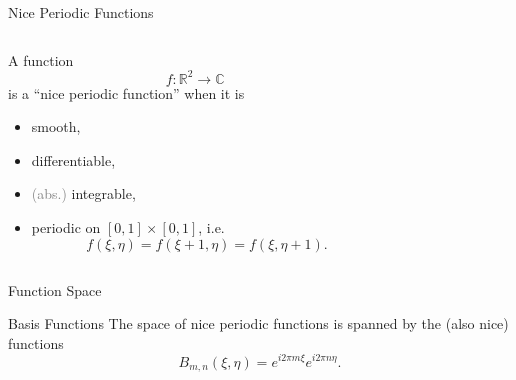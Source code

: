 \documentclass[xetex, onlymath, aspectratio=169]{beamer}
\begin{document}
\begin{frame}{Nice Periodic Functions}
	\begin{columns}
		\begin{column}{.7\linewidth}
    	\begin{definition}
    		A function
    		\[
    			f : \mathbb{R}^2 \to \mathbb{C}
    		\]
    		is a ``nice periodic function'' when it is
    		\begin{itemize}
    			\item smooth,
    			\item differentiable,
    			\item \textcolor{gray}{(abs.)} integrable,
    			\item periodic on \([0, 1] \times [0, 1]\), i.e.
    				\[
    					f(\xi, \eta) = f(\xi + 1, \eta) = f(\xi, \eta + 1).
    				\]
    		\end{itemize}
    	\end{definition}
		\end{column}
		\begin{column}{.3\linewidth}
			\begin{center}
			\end{center}
		\end{column}
	\end{columns}		
\end{frame}

\begin{frame}{Function Space}
	\begin{block}{Basis Functions}
  	The space of nice periodic functions is spanned by the (also nice) functions
  	\[
  		B_{m, n}(\xi, \eta) = e^{i2\pi m\xi} e^{i2\pi n\eta}.
  	\]
	\end{block}
\end{frame}
\end{document}
